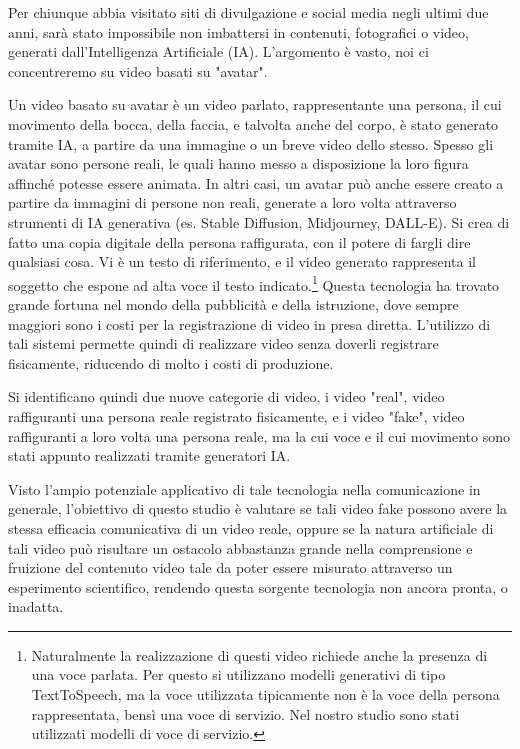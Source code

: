 
Per chiunque abbia visitato siti di divulgazione e  social media negli ultimi due anni, sarà stato impossibile non imbattersi in contenuti, fotografici o video, generati dall'Intelligenza Artificiale (IA). L'argomento è vasto, noi ci concentreremo su video basati su "avatar".


Un video basato su avatar è un video parlato, rappresentante una persona, il cui movimento della bocca, della faccia, e talvolta anche del corpo, è stato generato tramite IA, a partire da una immagine o un breve video dello stesso. Spesso gli avatar sono persone reali, le quali hanno messo a disposizione la loro figura affinché potesse essere animata. In altri casi, un avatar può anche essere creato a partire da immagini di persone non reali, generate a loro volta attraverso strumenti di IA generativa (es. Stable Diffusion, Midjourney, DALL-E). Si crea di fatto una copia digitale della persona raffigurata, con il potere di fargli dire qualsiasi cosa. Vi è un testo di riferimento, e il video generato rappresenta il soggetto che espone ad alta voce il testo indicato.\footnote{Naturalmente la realizzazione di questi video richiede anche la presenza di una voce parlata. Per questo si utilizzano modelli generativi di tipo TextToSpeech, ma la voce utilizzata tipicamente non è la voce della persona rappresentata, bensì una voce di servizio. Nel nostro studio sono stati utilizzati modelli di voce di servizio.} Questa tecnologia ha trovato grande fortuna nel mondo della pubblicità e della istruzione, dove sempre maggiori sono i costi per la registrazione di video in presa diretta. L'utilizzo di tali sistemi permette quindi di realizzare video senza doverli registrare fisicamente, riducendo di molto i costi di produzione.

Si identificano quindi due nuove categorie di video, i video "real", video raffiguranti una persona reale registrato fisicamente, e i video "fake", video raffiguranti a loro volta una persona reale, ma la cui voce e il cui movimento sono stati appunto realizzati tramite generatori IA.

Visto l'ampio potenziale applicativo di tale tecnologia nella comunicazione in generale, l'obiettivo di questo studio è valutare se tali video fake possono avere la stessa efficacia comunicativa di un video reale, oppure se la natura artificiale di tali video può risultare un ostacolo abbastanza grande nella comprensione e fruizione del contenuto video tale da poter essere misurato attraverso un esperimento scientifico, rendendo questa sorgente tecnologia non ancora pronta, o inadatta. 

